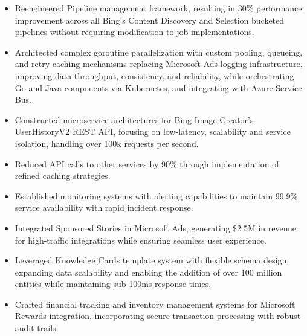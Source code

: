 \begin{itemize}
    \item \small{Reengineered Pipeline management framework, resulting in 30\% performance
        improvement across all Bing's Content Discovery and Selection bucketed pipelines without
        requiring modification to job implementations.}

    \item \small{Architected complex goroutine parallelization with custom pooling, queueing, and retry 
        caching mechanisms replacing Microsoft Ads logging infrastructure, improving data throughput,
        consistency, and reliability, while orchestrating Go and Java components via Kubernetes, and
        integrating with Azure Service Bus.}
    
    \item \small{Constructed microservice architectures for Bing Image Creator's UserHistoryV2 REST 
        API, focusing on low-latency, scalability and service isolation, handling over 100k requests per 
        second.}
    \item \small{Reduced API calls to other services by 90\% through implementation of refined caching strategies.}
    
    \item \small{Established monitoring systems with alerting capabilities to maintain 99.9\%
        service availability with rapid incident response.}


    \item \small{Integrated Sponsored Stories in Microsoft Ads, generating \$2.5M in revenue for
        high-traﬀic integrations while ensuring seamless user experience.}

    \item \small{Leveraged Knowledge Cards template system with flexible schema design, expanding
        data scalability and enabling the addition of over 100 million entities while maintaining
        sub-100ms response times.}

    \item \small{Crafted financial tracking and inventory management systems for Microsoft Rewards
        integration, incorporating secure transaction processing with robust audit trails.}

\end{itemize}